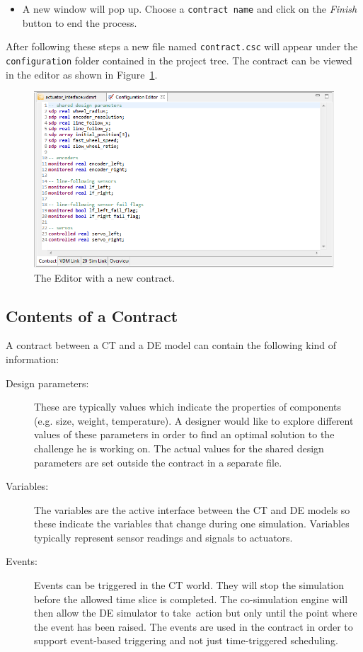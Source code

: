 \documentclass{crescendorepchap}
\begin{document}
\begin{itemize}
\item
  A new window will pop up. Choose a \texttt{contract name} and click on
  the \emph{Finish} button to end the process.
\end{itemize}

After following these steps a new file named \texttt{contract.csc} will
appear under the \texttt{con\-fig\-ura\-tion} folder contained in the project
tree. The contract can be viewed in the editor as shown in Figure~\ref{fig:editorcontract2}.

\begin{figure}[htbp]
\centering
\includegraphics[width=.6\textwidth]{images/DestecsEditorNewContract.png}
\caption{The Editor with a new contract.\label{fig:editorcontract2}}
\end{figure}

\subsection{Contents of a Contract}

A contract between a CT and a DE model can contain the following kind of
information:

\begin{description}
\item[Design parameters:] These are typically values which indicate
  the properties of components (e.g. size, weight, temperature). A
  designer would like to explore different values of these parameters in
  order to find an optimal solution to the challenge he is working on.
  The actual values for the shared design parameters are set outside the
  contract in a separate file.
\item[Variables:] The variables are the active interface between the
  CT and DE models so these indicate the variables that change during
  one simulation. Variables typically represent sensor readings and
  signals to actuators.
\item[Events:] Events can be triggered in the CT world. They
  will stop the simulation before the allowed time slice is completed.
  The co-simulation engine will then allow the DE simulator to
  take~action but only until the point where the event has been raised.
  The events are used in the contract in order to support event-based
  triggering and not just time-triggered scheduling.
\end{description}
\end{document}
